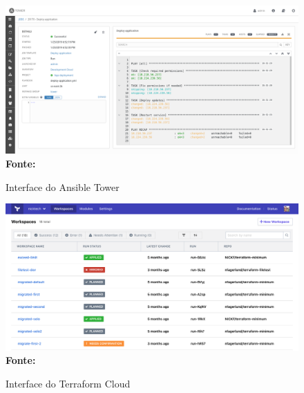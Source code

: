 \begin{figure}[H]
	\centering	
	\caption[\hspace{0.1cm} Interface do Ansible Tower]{ Interface do Ansible Tower}
	\vspace{-0.4cm}
	\includegraphics[width=1.0\textwidth]{artigo/figuras/RH-Ansible-Tower-job-details.png}
	 \vspace{-0.2cm}
	\\\textbf{\footnotesize Fonte: \cite{ansible_tower}}
	\label{fig:figura13}
\end{figure}
\vspace{-0.5cm}

\begin{figure}[H]
	\centering	
	\caption[\hspace{0.1cm} Interface do Terraform Cloud]{ Interface do Terraform Cloud}
	\vspace{-0.4cm}
	\includegraphics[width=1.0\textwidth]{artigo/figuras/terraform_cloud.png}
	 \vspace{-0.2cm}
	\\\textbf{\footnotesize Fonte: \cite{terraform_cloud}}
	\label{fig:figura14}
\end{figure}
\vspace{-0.5cm}

